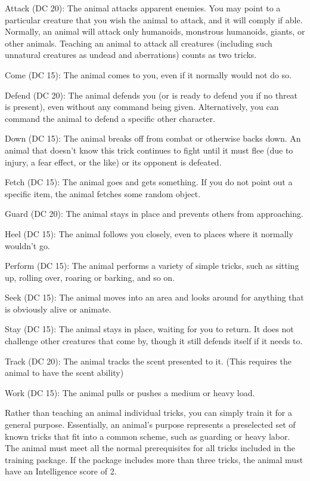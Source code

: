 \par Attack (DC 20): The animal attacks apparent enemies. You may point to a particular creature that you wish the animal to attack, and it will comply if able. Normally, an animal will attack only humanoids, monstrous humanoids, giants, or other animals. Teaching an animal to attack all creatures (including such unnatural creatures as undead and aberrations) counts as two tricks.
\par Come (DC 15): The animal comes to you, even if it normally would not do so.
\par Defend (DC 20): The animal defends you (or is ready to defend you if no threat is present), even without any command being given. Alternatively, you can command the animal to defend a specific other character.
\par Down (DC 15): The animal breaks off from combat or otherwise backs down. An animal that doesn't know this trick continues to fight until it must flee (due to injury, a fear effect, or the like) or its opponent is defeated.
\par Fetch (DC 15): The animal goes and gets something. If you do not point out a specific item, the animal fetches some random object.
\par Guard (DC 20): The animal stays in place and prevents others from approaching.
\par Heel (DC 15): The animal follows you closely, even to places where it normally wouldn't go.
\par Perform (DC 15): The animal performs a variety of simple tricks, such as sitting up, rolling over, roaring or barking, and so on.
\par Seek (DC 15): The animal moves into an area and looks around for anything that is obviously alive or animate.
\par Stay (DC 15): The animal stays in place, waiting for you to return. It does not challenge other creatures that come by,
though it still defends itself if it needs to.
\par Track (DC 20): The animal tracks the scent presented to it. (This requires the animal to have the scent ability)
\par Work (DC 15): The animal pulls or pushes a medium or heavy load.

 Rather than teaching an animal individual tricks, you can simply train it for a general purpose. Essentially, an animal's purpose represents a preselected set of known tricks that fit into a common scheme, such as guarding or heavy labor. The animal must meet all the normal prerequisites for all tricks included in the training package. If the package includes more than three tricks, the animal must have an Intelligence score of 2.

